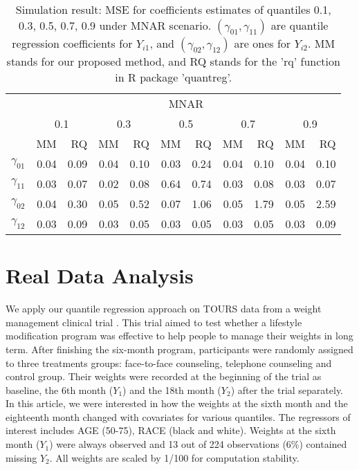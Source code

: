 \documentclass[12pt]{article}
\begin{document}
\begin{table}[h]
  \renewcommand{\arraystretch}{1.3}
  \centering
  \caption{Simulation result: MSE for coefficients estimates of quantiles
    0.1, 0.3, 0.5, 0.7, 0.9 under MNAR scenario. $(\gamma_{01}, \gamma_{11})$
    are quantile regression coefficients for $Y_{i1}$, and $(\gamma_{02}, \gamma_{12})$
    are ones for $Y_{i2}$. MM stands for our proposed method, and RQ stands for the 'rq'
    function in R package 'quantreg'.}
  \vspace{10pt}
  \begin{tabular}{rrrrrrrrrrr}
    \toprule
    & \multicolumn{ 10}{c}{MNAR} \\
    \cline{2-11}
    &  \multicolumn{2}{c}{0.1} &  \multicolumn{2}{c}{0.3} &  \multicolumn{2}{c}{0.5}
    &  \multicolumn{2}{c}{0.7} &  \multicolumn{2}{c}{0.9} \\
    \cline{2-11}
    & MM & RQ    & MM & RQ    & MM & RQ    & MM & RQ    & MM & RQ \\
    \hline
    $\gamma_{01}$ & 0.04 &0.09&0.04 &0.10 &0.03 &0.24 &0.04 &0.10 &0.04 &0.10 \\
    $\gamma_{11}$ & 0.03 &0.07&0.02 &0.08 &0.64 &0.74 &0.03 &0.08 &0.03 &0.07 \\
    $\gamma_{02}$ & 0.04 &0.30&0.05 &0.52 &0.07 &1.06 &0.05 &1.79 &0.05 &2.59 \\
    $\gamma_{12}$ & 0.03 &0.09&0.03 &0.05 &0.03 &0.05 &0.03 &0.05 &0.03 &0.09 \\
    \bottomrule
  \end{tabular}  \label{tab:sim2}
\end{table}


\section{Real Data Analysis}
\label{sec:real}
We apply our quantile regression approach on TOURS data from a weight
management clinical trial \citep{perri2008extended}.  This trial aimed
to test whether a lifestyle modification program was effective to help
people to manage their weights in long term. After finishing the
six-month program, participants were randomly assigned to three
treatments groups: face-to-face counseling, telephone counseling and
control group. Their weights were recorded at the beginning of the
trial as baseline, the 6th month ($Y_1$) and the 18th month ($Y_2$)
after the trial separately. In this article, we were interested in how
the weights at the sixth month and the eighteenth month changed with
covariates for various quantiles. The regressors of interest includes
AGE (50-75), RACE (black and white). Weights at the sixth month
($Y_1$) were always observed and 13 out of 224 observations (6\%)
contained missing $Y_2$. All weights are scaled by 1/100 for
computation stability.
\end{document}
